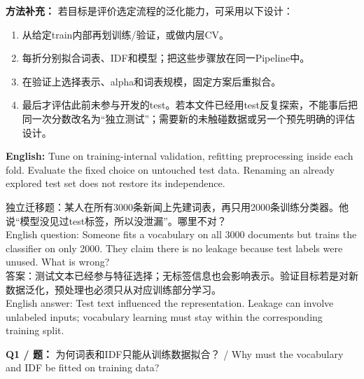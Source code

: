 \textbf{方法补充：} 若目标是评价选定流程的泛化能力，可采用以下设计：



\begin{enumerate}[start=1]

\item 从给定train内部再划训练/验证，或做内层CV。

\item 每折分别拟合词表、IDF和模型；把这些步骤放在同一Pipeline中。

\item 在验证上选择表示、alpha和词表规模，固定方案后重拟合。

\item 最后才评估此前未参与开发的test。若本文件已经用test反复探索，不能事后把同一次分数改名为“独立测试”；需要新的未触碰数据或另一个预先明确的评估设计。

\end{enumerate}


\textbf{English:} Tune on training-internal validation, refitting preprocessing inside each fold. Evaluate the fixed choice on untouched test data. Renaming an already explored test set does not restore its independence.


独立迁移题：某人在所有3000条新闻上先建词表，再只用2000条训练分类器。他说“模型没见过test标签，所以没泄漏”。哪里不对？\\

English question: Someone fits a vocabulary on all 3000 documents but trains the classifier on only 2000. They claim there is no leakage because test labels were unused. What is wrong?\\

答案：测试文本已经参与特征选择；无标签信息也会影响表示。验证目标若是对新数据泛化，预处理也必须只从对应训练部分学习。\\

English answer: Test text influenced the representation. Leakage can involve unlabeled inputs; vocabulary learning must stay within the corresponding training split.







\textbf{Q1 / 题：} 为何词表和IDF只能从训练数据拟合？ / Why must the vocabulary and IDF be fitted on training data?

